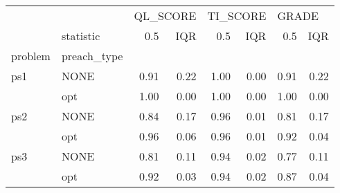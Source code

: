 \begin{tabular}{llrrrrrr}
\toprule
    & {} & \multicolumn{2}{l}{QL\_SCORE} & \multicolumn{2}{l}{TI\_SCORE} & \multicolumn{2}{l}{GRADE} \\
    & statistic &      0.5 &  IQR &      0.5 &  IQR &   0.5 &  IQR \\
problem & preach\_type &          &      &          &      &       &      \\
\midrule
ps1 & NONE &     0.91 & 0.22 &     1.00 & 0.00 &  0.91 & 0.22 \\
    & opt &     1.00 & 0.00 &     1.00 & 0.00 &  1.00 & 0.00 \\
ps2 & NONE &     0.84 & 0.17 &     0.96 & 0.01 &  0.81 & 0.17 \\
    & opt &     0.96 & 0.06 &     0.96 & 0.01 &  0.92 & 0.04 \\
ps3 & NONE &     0.81 & 0.11 &     0.94 & 0.02 &  0.77 & 0.11 \\
    & opt &     0.92 & 0.03 &     0.94 & 0.02 &  0.87 & 0.04 \\
\bottomrule
\end{tabular}
